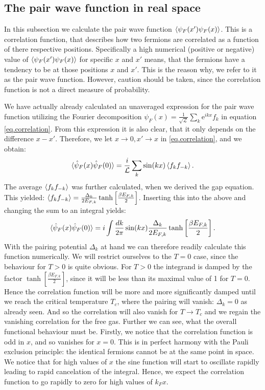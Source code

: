 \subsection{The pair wave function in real space}
In this subsection we calculate the pair wave function $\braket{\psi_F(x')\psi_F(x)}$. This is a correlation function, that describes how two fermions are correlated as a function of there respective positions. Specifically a high numerical (positive or negative) value of $\braket{\psi_F(x')\psi_F(x)}$ for specific $x$ and $x'$ means, that the fermions have a tendency to be at those positions $x$ and $x'$. This is the reason why, we refer to it as the pair wave function. However, caution should be taken, since the correlation function is not a direct measure of probability. 

We have actually already calculated an unaveraged expression for the pair wave function utilizing the Fourier decomposition $\psi_F(x) = \frac{1}{\sqrt{\mathcal{L}}} \sum_k \text{e}^{ikx} f_k$ in equation \eqref{eq.correlation}. From this expression it is also clear, that it only depends on the difference $x-x'$. Therefore, we let $x \to 0, x' \to x$ in \eqref{eq.correlation}, and we obtain:
\begin{equation}
\braket{\hat{\psi}_F(x) \hat{\psi}_F(0)} = \frac{i}{\mathcal{L}}\sum_{k} \sin(kx)\braket{f_{k}f_{-k}}. \nonumber
\end{equation}
The average $\braket{f_{k}f_{-k}}$ was further calculated, when we derived the gap equation. This yielded: $\braket{f_{k}f_{-k}} = \frac{\Delta_k}{2E_{F,k}}\tanh\left[\frac{\beta E_{F,k} }{2}\right]$. Inserting this into the above and changing the sum to an integral yields:
\begin{equation}
\braket{\hat{\psi}_F(x) \hat{\psi}_F(0)} = i\int \frac{dk}{2\pi} \sin(kx)\frac{\Delta_k}{2E_{F,k}}\tanh\left[\frac{ \beta E_{F,k} }{2}\right].
\label{eq.pairwavefunction}
\end{equation}
With the pairing potential $\Delta_k$ at hand we can therefore readily calculate this function numerically. We will restrict ourselves to the $T = 0$ case, since the behaviour for $T > 0$ is quite obvious. For $T > 0$ the integrand is damped by the factor $\tanh\left[\frac{ \beta E_{F,k} }{2}\right]$, since it will be less than its maximal value of 1 for $T = 0$. Hence the correlation function will be more and more significantly damped until we reach the critical temperature $T_c$, where the pairing will vanish: $\Delta_k = 0$ as already seen. And so the correlation will also vanish for $T\to T_c$ and we regain the vanishing correlation for the free gas. Further we can see, what the overall functional behaviour must be. Firstly, we notice that the correlation function is odd in $x$, and so vanishes for $x = 0$. This is in perfect harmony with the Pauli exclusion principle: the identical fermions cannot be at the same point in space. We notice that for high values of $x$ the sine function will start to oscillate rapidly leading to rapid cancelation of the integral. Hence, we expect the correlation function to go rapidly to zero for high values of $k_F x$. 

